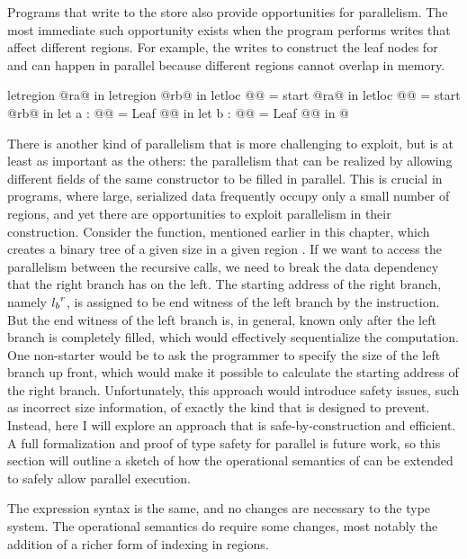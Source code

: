 Programs that write to the store also provide opportunities for
parallelism.
%
The most immediate such opportunity exists when the program performs
writes that affect different regions.
%
For example, the writes to construct the leaf nodes for  and
 can happen in parallel because different regions cannot overlap
in memory.
%
\begin{code}
letregion @ra@ in
letregion @rb@ in
letloc @@ = start @ra@ in
letloc @@ = start @rb@ in
let a : @@ = Leaf @@ in
let b : @@ = Leaf @@ in
@\ldots@
\end{code}
%
There is another kind of parallelism that is more challenging
to exploit, but is at least as important as the others:
%
the parallelism that can be realized by allowing different fields
of the same constructor to be filled in parallel.
%
This is crucial in \ourcalc{} programs, where large, serialized data
frequently occupy only a small number of regions, and yet there are
opportunities to exploit parallelism in their construction.
%
Consider the  function, mentioned earlier in this chapter, which
creates a binary tree of a given size  in a given region .
%
If we want to access the parallelism between the recursive calls,
we need to break the data dependency that the right branch has on
the left.
%
The starting address of the right branch, namely ${l_b}^{r}$, is
assigned to be end witness of the left branch by the 
instruction.
%
But the end witness of the left branch is, in general, known only
after the left branch is completely filled, which would effectively
sequentialize the computation.
%
One non-starter would be to ask the programmer to specify the
size of the left branch up front, which would make it possible to
calculate the starting address of the right branch.
%
Unfortunately, this approach would introduce safety issues, such as
incorrect size information, of exactly the kind that \ourcalc{}
is designed to prevent.
%
Instead, here I will explore an approach that is safe-by-construction and
efficient.
%
%
A full formalization and proof of type safety for parallel \ourcalc{}
is future work, so this section will outline a sketch of
how the operational semantics of \ourcalc{} can be extended
to safely allow parallel execution.



The expression syntax is the same, and no changes are necessary to the type system.
The operational semantics do require some changes, most notably the addition
of a richer form of indexing in regions.


